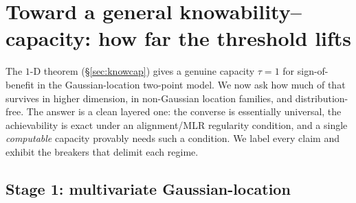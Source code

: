 %
%
%
\section{Toward a general knowability--capacity: how far the threshold lifts}
\label{sec:knowcap-gen}

The $1$-D theorem (\S\ref{sec:knowcap}) gives a genuine capacity $\tau=1$ for
sign-of-benefit in the Gaussian-location two-point model. We now ask how much of
that survives in higher dimension, in non-Gaussian location families, and
distribution-free. The answer is a clean layered one: the converse is essentially
universal, the achievability is exact under an alignment/MLR regularity condition,
and a single \emph{computable} capacity provably needs such a condition. We label
every claim and exhibit the breakers that delimit each regime.

\subsection{Stage 1: multivariate Gaussian-location}\label{sec:gen-mvg}

